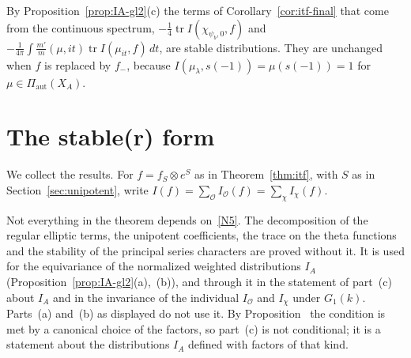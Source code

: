 By Proposition~\ref{prop:IA-gl2}(c) the terms of
Corollary~\ref{cor:itf-final} that come from the continuous spectrum,
$-\frac14\operatorname{tr}I(\chi_{\psi_b,0},f)$ and $-\frac1{4\pi}\int
\frac{m'}m(\mu,it)\operatorname{tr}I(\mu_{it},f)\,dt$, are stable
distributions. They are unchanged when $f$ is replaced by $f_-$, because
$I(\mu_\lambda,s(-1))=\mu(s(-1))=1$ for $\mu\in\Pi_{\mathrm{aut}}(X_A)$.

\section{The stable(r) form}\label{sec:stable-form}

We collect the results. For $f=f_S\otimes e^S$ as in
Theorem~\ref{thm:itf}, with $S$ as in Section~\ref{sec:unipotent}, write
$I(f)=\sum_{\mathcal O}I_{\mathcal O}(f)=\sum_\chi I_\chi(f)$.

Not everything in the theorem depends on~\ref{N5}. The decomposition of
the regular elliptic terms, the unipotent coefficients, the trace on the
theta functions and the stability of the principal series characters are
proved without it. It is used for the equivariance of the normalized
weighted distributions $I_A$ (Proposition~\ref{prop:IA-gl2}(a),~(b)), and
through it in the statement of part~(c) about $I_A$ and in the invariance
of the individual $I_{\mathcal O}$ and $I_\chi$ under $G_1(k)$. Parts~(a)
and~(b) as displayed do not use it. By Proposition~\normref{} the
condition is met by a canonical choice of the factors, so part~(c) is not
conditional; it is a statement about the distributions $I_A$ defined with
factors of that kind.

